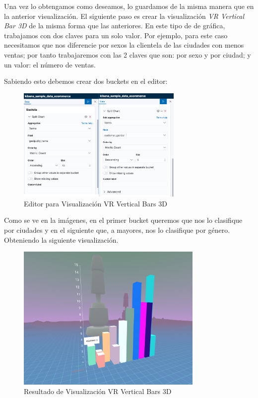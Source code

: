 \documentclass[a4paper, 12pt]{book}
\begin{document}
Una vez lo obtengamos como deseamos, lo guardamos de la misma manera que en la anterior visualización.
El siguiente paso es crear la visualización \textit{VR Vertical Bar 3D} de la misma forma que las anteriores. En este tipo de de gráfica, trabajamos con dos claves para un solo valor. Por ejemplo, para este caso necesitamos que nos diferencie por sexos la clientela de las ciudades con menos ventas; por tanto trabajaremos con las 2 claves que son: por sexo y por ciudad; y un valor: el número de ventas.

Sabiendo esto debemos crear dos buckets en el editor:

\begin{figure}[H]
  \centering
  \includegraphics[width=8cm, keepaspectratio]{img/development/editor-3dbars.png}
  \caption{Editor para Visualización VR Vertical Bars 3D}
  \label{fig:editor3dbar}
\end{figure}

Como se ve en la imágenes, en el primer bucket queremos que nos lo clasifique por ciudades y en el siguiente que, a mayores, nos lo clasifique por género. Obteniendo la siguiente visualización.

\begin{figure}[H]
  \centering
  \includegraphics[width=9cm, keepaspectratio]{img/development/visualizacion-3d-bar-use.png}
  \caption{Resultado de Visualización VR Vertical Bars 3D}
  \label{fig:visualizacion3dbar}
\end{figure}
\end{document}

